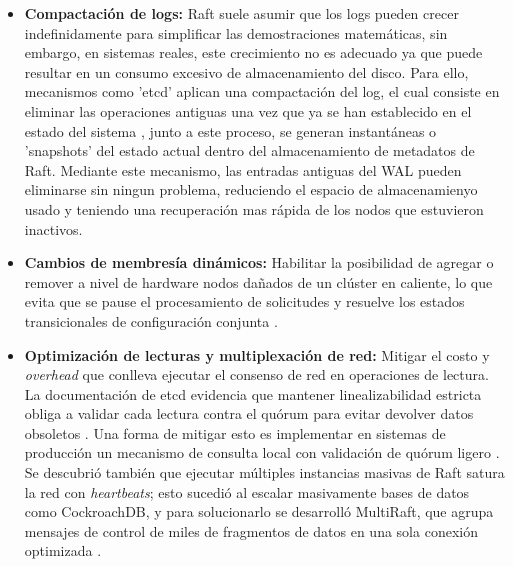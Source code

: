 \documentclass[12pt,letterpaper]{article}
\begin{document}
\begin{itemize}
    \item \textbf{Compactación de logs:} Raft suele asumir que los logs pueden crecer indefinidamente para simplificar las demostraciones matemáticas, sin embargo, en sistemas reales, este crecimiento no es adecuado ya que puede resultar en un consumo excesivo de almacenamiento del disco. Para ello, mecanismos como 'etcd' aplican una compactación del log, el cual consiste en eliminar las operaciones antiguas una vez que ya se han establecido en el estado del sistema \cite{etcd2021}, junto a este proceso, se generan instantáneas o 'snapshots' del estado actual dentro del almacenamiento de metadatos de Raft. Mediante este mecanismo, las entradas antiguas del WAL pueden eliminarse sin ningun problema, reduciendo el espacio de almacenamienyo usado y teniendo una recuperación mas rápida de los nodos que estuvieron inactivos.  \cite{lebow2025}
    
    
   \item \textbf{Cambios de membresía dinámicos:} Habilitar la posibilidad de agregar o remover a nivel de hardware nodos dañados de un clúster en caliente, lo que evita que se pause el procesamiento de solicitudes y resuelve los estados transicionales de configuración conjunta \cite{liang2025}.
    
    \item \textbf{Optimización de lecturas y multiplexación de red:} Mitigar el costo y \textit{overhead} que conlleva ejecutar el consenso de red en operaciones de lectura. La documentación de etcd evidencia que mantener linealizabilidad estricta obliga a validar cada lectura contra el quórum para evitar devolver datos obsoletos \cite{etcd2021}. Una forma de mitigar esto es implementar en sistemas de producción un mecanismo de consulta local con validación de quórum ligero \cite{lebow2025}. Se descubrió también que ejecutar múltiples instancias masivas de Raft satura la red con \textit{heartbeats}; esto sucedió al escalar masivamente bases de datos como CockroachDB, y para solucionarlo se desarrolló MultiRaft, que agrupa mensajes de control de miles de fragmentos de datos en una sola conexión optimizada \cite{cockroach2015}.
\end{itemize}
\end{document}
